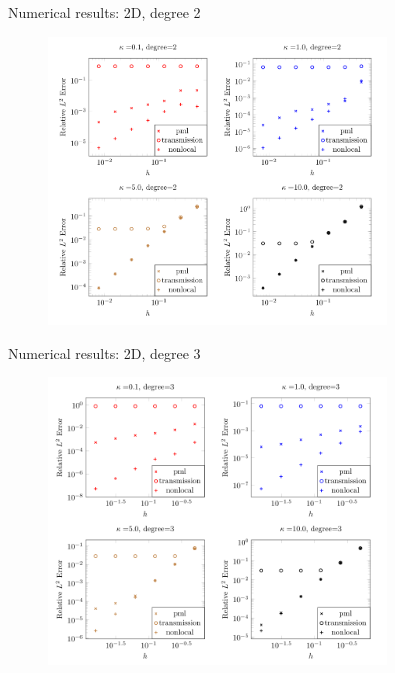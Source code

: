 \documentclass{beamer}
\begin{document}
\begin{frame}[noframenumbering]{Numerical results: 2D, degree 2}
    \begin{figure}[ht]
    \begin{center}
        \includegraphics[width=0.8\textwidth]{images/degree-2-accuracy.png}
    \end{center}
    \end{figure}
\end{frame}
\begin{frame}[noframenumbering]{Numerical results: 2D, degree 3}
    \begin{figure}[ht]
    \begin{center}
        \includegraphics[width=0.8\textwidth]{images/degree-3-accuracy.png}
    \end{center}
    \end{figure}
\end{frame}
\end{document}
